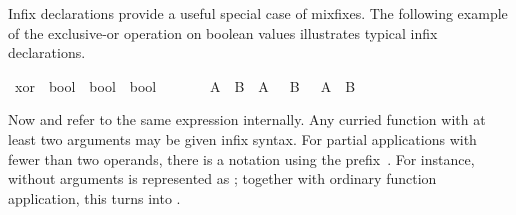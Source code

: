 \begin{isabellebody}
\begin{isamarkuptext}
  Infix declarations provide a useful special
  case of mixfixes.  The following example of the exclusive-or
  operation on boolean values illustrates typical infix declarations.%
\end{isamarkuptext}%
\isamarkuptrue%
\isamarkupfalse%
\ xor\ {}{}\ {}bool\ {}\ bool\ {}\ bool{}\ \ \ \ {}\ {}{}{}{}{}\ {}{}{}\isanewline
{}\ {}A\ {}{}{}\ B\ {}\ {}A\ {}\ {}\ B{}\ {}\ {}{}\ A\ {}\ B{}{}%
\begin{isamarkuptext}%
\noindent Now  and  refer to the
  same expression internally.  Any curried function with at least two
  arguments may be given infix syntax.  For partial applications with
  fewer than two operands, there is a notation using the prefix~.  For instance,  without arguments is represented as
  ; together with ordinary function application, this
  turns  into .


\end{isamarkuptext}
\end{isabellebody}
